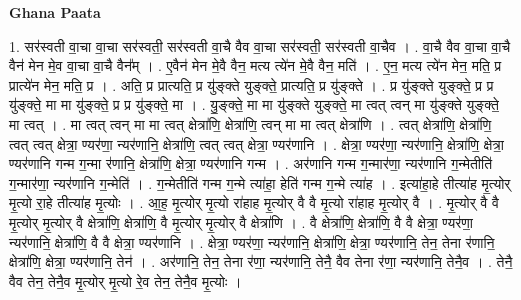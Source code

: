 \documentclass[17pt]{extarticle}
\begin{document}
\textbf{Ghana Paata } \newline

1. सर॑स्वती वा॒चा वा॒चा सर॑स्वती॒ सर॑स्वती वा॒चै वैव वा॒चा सर॑स्वती॒ सर॑स्वती वा॒चैव । . वा॒चै वैव वा॒चा वा॒चै वैन॑ मेन मे॒व वा॒चा वा॒चै वैन᳚म् । . ए॒वैन॑ मेन मे॒वै वैन॒ मत्य त्ये॑न मे॒वै वैन॒ मति॑ । . ए॒न॒ मत्य त्ये॑न मेन॒ मति॒ प्र प्रात्ये॑न मेन॒ मति॒ प्र । . अति॒ प्र प्रात्यति॒ प्र यु॑ङ्क्ते युङ्क्ते॒ प्रात्यति॒ प्र यु॑ङ्क्ते । . प्र यु॑ङ्क्ते युङ्क्ते॒ प्र प्र यु॑ङ्क्ते॒ मा मा यु॑ङ्क्ते॒ प्र प्र यु॑ङ्क्ते॒ मा । . यु॒ङ्क्ते॒ मा मा यु॑ङ्क्ते युङ्क्ते॒ मा त्वत् त्वन् मा यु॑ङ्क्ते युङ्क्ते॒ मा त्वत् । . मा त्वत् त्वन् मा मा त्वत् क्षेत्रा॑णि॒ क्षेत्रा॑णि॒ त्वन् मा मा त्वत् क्षेत्रा॑णि । . त्वत् क्षेत्रा॑णि॒ क्षेत्रा॑णि॒ त्वत् त्वत् क्षेत्रा॒ ण्यर॑णा॒ न्यर॑णानि॒ क्षेत्रा॑णि॒ त्वत् त्वत् क्षेत्रा॒ ण्यर॑णानि । . क्षेत्रा॒ ण्यर॑णा॒ न्यर॑णानि॒ क्षेत्रा॑णि॒ क्षेत्रा॒ ण्यर॑णानि गन्म ग॒न्मा र॑णानि॒ क्षेत्रा॑णि॒ क्षेत्रा॒ ण्यर॑णानि गन्म । . अर॑णानि गन्म ग॒न्मार॑णा॒ न्यर॑णानि ग॒न्मेतीति॑ ग॒न्मार॑णा॒ न्यर॑णानि ग॒न्मेति॑ । . ग॒न्मेतीति॑ गन्म ग॒न्मे त्या॑हा॒ हेति॑ गन्म ग॒न्मे त्या॑ह । . इत्या॑हा॒हे तीत्या॑ह मृ॒त्योर् मृ॒त्यो रा॒हे तीत्या॑ह मृ॒त्योः । . आ॒ह॒ मृ॒त्योर् मृ॒त्यो रा॑हाह मृ॒त्योर् वै वै मृ॒त्यो रा॑हाह मृ॒त्योर् वै । . मृ॒त्योर् वै वै मृ॒त्योर् मृ॒त्योर् वै क्षेत्रा॑णि॒ क्षेत्रा॑णि॒ वै मृ॒त्योर् मृ॒त्योर् वै क्षेत्रा॑णि । . वै क्षेत्रा॑णि॒ क्षेत्रा॑णि॒ वै वै क्षेत्रा॒ ण्यर॑णा॒ न्यर॑णानि॒ क्षेत्रा॑णि॒ वै वै क्षेत्रा॒ ण्यर॑णानि । . क्षेत्रा॒ ण्यर॑णा॒ न्यर॑णानि॒ क्षेत्रा॑णि॒ क्षेत्रा॒ ण्यर॑णानि॒ तेन॒ तेना र॑णानि॒ क्षेत्रा॑णि॒ क्षेत्रा॒ ण्यर॑णानि॒ तेन॑ । . अर॑णानि॒ तेन॒ तेना र॑णा॒ न्यर॑णानि॒ तेनै॒ वैव तेना र॑णा॒ न्यर॑णानि॒ तेनै॒व । . तेनै॒ वैव तेन॒ तेनै॒व मृ॒त्योर् मृ॒त्यो रे॒व तेन॒ तेनै॒व मृ॒त्योः । \newline
\end{document}
